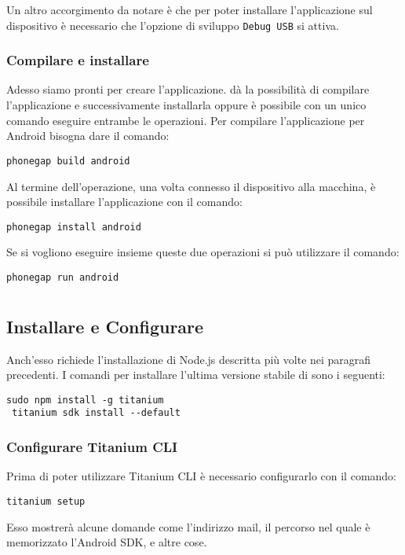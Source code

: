             Un altro accorgimento da notare è che per poter installare 
            l'applicazione sul dispositivo è necessario che l'opzione di 
            sviluppo \texttt{Debug USB} si attiva. 
            
        \subsubsection{Compilare e installare}
            Adesso siamo pronti per creare l'applicazione. \pg{} dà la 
            possibilità di compilare l'applicazione e successivamente 
            installarla oppure è possibile con un unico comando eseguire 
            entrambe le operazioni. Per compilare l'applicazione per Android 
            bisogna dare il comando:
            \begin{lstlisting}[language=plane]
 phonegap build android
            \end{lstlisting}
            Al termine dell'operazione, una volta connesso il dispositivo alla 
            macchina, è possibile installare l'applicazione con il comando:
            \begin{lstlisting}[language=plane]
 phonegap install android
            \end{lstlisting}
            
            Se si vogliono eseguire insieme queste due operazioni si può 
            utilizzare il comando:
            \begin{lstlisting}[language=plane]
 phonegap run android
            \end{lstlisting}

\section{\tisdk{}}

    \subsection{Installare e Configurare \tisdk{}}
    Anch'esso richiede l'installazione di Node.js descritta più volte nei
    paragrafi precedenti. I comandi per installare l'ultima versione stabile
    di \tisdk{} sono i seguenti:
    \begin{lstlisting}[language=plane]
 sudo npm install -g titanium
 titanium sdk install --default
    \end{lstlisting}
        \subsubsection{Configurare Titanium CLI}
        Prima di poter utilizzare Titanium CLI è necessario configurarlo con
        il comando:
    \begin{lstlisting}[language=plane]
 titanium setup
    \end{lstlisting}
    Esso mostrerà alcune domande come l'indirizzo mail, il percorso nel quale
    è memorizzato l'Android SDK, e altre cose.

